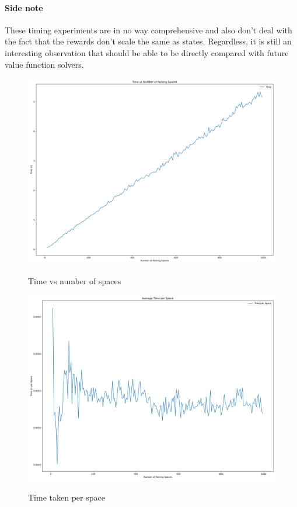\documentclass[12pt]{article}
\begin{document}
\paragraph{Side note} These timing experiments are in no way comprehensive and also don't deal with the fact that the rewards don't scale the same as states. Regardless, it is still an interesting observation that should be able to be directly compared with future value function solvers.

\begin{figure}
  \includegraphics[width=0.95\linewidth]{Figures/time_vs_spaces.png}
  \centering
  \label{fig:time-vs-spaces}
  \caption{Time vs number of spaces}
\end{figure}

\begin{figure}
  \includegraphics[width=0.95\linewidth]{Figures/time_per_space.png}
  \centering
  \label{fig:time-per-space}
  \caption{Time taken per space}
\end{figure}
\end{document}
